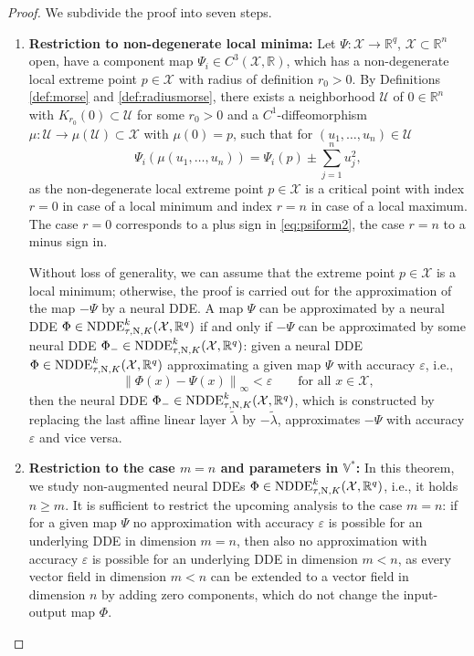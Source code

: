 \documentclass[10pt]{article}
\numberwithin{equation}{section}
\newcommand{\eps}{\varepsilon}
\newcommand\norm[1]{\left\lVert#1\right\rVert}
\begin{document}
	\begin{proof}
		We subdivide the proof into seven steps.
		\begin{enumerate}
			\item \textbf{Restriction to non-degenerate local minima:} Let $\Psi:\mathcal{X}\rightarrow \mathbb{R}^q$,  $\mathcal{X}\subset \mathbb{R}^n$ open, have a component map $\Psi_i\in C^3(\mathcal{X}, \mathbb{R})$, which has a non-degenerate local extreme point $p \in \mathcal{X}$ with radius of definition $r_0>0$. By Definitions \ref{def:morse} and \ref{def:radiusmorse}, there exists  a neighborhood $\mathcal{U}$ of $0 \in \mathbb{R}^n$ with  $K_{r_0}(0)\subset \mathcal{U}$ for some $r_0>0$ and a $C^1$-diffeomorphism $\mu: \mathcal{U} \rightarrow \mu(\mathcal{U}) \subset \mathcal{X}$ with $\mu(0) = p$, such that for $(u_1,\ldots,u_n) \in \mathcal{U}$
			\begin{equation} \label{eq:psiform2}
				\Psi_i(\mu(u_1,\ldots,u_n)) = \Psi_i(p) \pm \sum_{j = 1}^n u_j^2,
			\end{equation}
			as the non-degenerate local extreme point $p \in \mathcal{X}$ is a critical point with index $r = 0$ in case of a local minimum and index $r = n$ in case of a local maximum. The case $r = 0$ corresponds to a plus sign in \eqref{eq:psiform2}, the case $r = n$ to a minus sign in.
			
			Without loss of generality, we can assume that the extreme point $p\in \mathcal{X}$ is a local minimum; otherwise, the proof is carried out for the approximation of the map $-\Psi$ by a neural DDE. A map $\Psi$ can be approximated by a neural DDE  $\Phi \in \textup{NDDE}_{\tau,\textup{N},K}^k(\mathcal{X},\mathbb{R}^q)$ if and only if $-\Psi$ can be approximated by some neural DDE  $\Phi_{-} \in \textup{NDDE}_{\tau,\textup{N},K}^k(\mathcal{X},\mathbb{R}^q)$: given a neural DDE $\Phi \in \textup{NDDE}_{\tau,\textup{N},K}^k(\mathcal{X},\mathbb{R}^q)$ approximating a given map $\Psi$ with accuracy $\eps$, i.e.,
			\begin{equation*}
				\norm{\Phi(x)-\Psi(x)}_\infty < \eps \qquad \text{for all } x \in \mathcal{X},
			\end{equation*}
			then the neural DDE $\Phi_{-} \in \textup{NDDE}_{\tau,\textup{N},K}^k(\mathcal{X},\mathbb{R}^q)$, which is constructed by replacing the last affine linear layer  $\tilde{\lambda}$ by $-\tilde{\lambda}$, approximates $-\Psi$ with accuracy $\eps$ and vice versa.
			\item \textbf{Restriction to the case $m = n$ and parameters in $\mathbb{V}^\ast$:} In this theorem, we study non-augmented neural DDEs $\Phi\in \textup{NDDE}_{\tau,\textup{N},K}^k(\mathcal{X},\mathbb{R}^q)$, i.e., it holds $n \geq m$. It is sufficient to restrict the upcoming analysis to the case $m = n$: if for a given map $\Psi$ no approximation with accuracy $\eps$ is possible for an underlying DDE in dimension $m=n$, then also no approximation with accuracy $\eps$ is possible for an underlying DDE in dimension $m<n$, as every vector field in dimension $m<n$ can be extended to a vector field in dimension $n$ by adding zero components, which do not change the input-output map $\Phi$.
			

\end{enumerate}
\end{proof}
\end{document}
